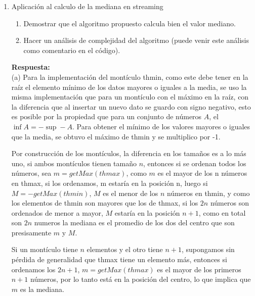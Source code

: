 \documentclass[11pt]{article}
\begin{document}
\begin{enumerate}
\begin{itemize}
\end{itemize}

\item Aplicación al calculo de la mediana en streaming
\begin{enumerate}
\item Demostrar que el algoritmo propuesto calcula bien el valor mediano.
\item Hacer un análisis de complejidad del algoritmo (puede venir este análisis como comentario en el
código).
\end{enumerate}
\textbf{Respuesta:}
\\
(a) Para la implementación del montículo thmin, como este debe tener en la raíz el elemento mínimo de los datos mayores o iguales a la media, se uso la misma implementación que para un montículo con el máximo en la raíz, con la diferencia que al insertar un nuevo dato se guardo con signo negativo, esto es posible por la propiedad que para un conjunto de números $A$, el $\inf A = -\sup -A$. Para obtener el mínimo de los valores mayores o iguales que la media, se obtuvo el máximo de thmin y se multiplico por -1.

Por construcción de los  montículos, la diferencia en los tamaños es a lo más uno, si ambos montículos tienen tamaño $n$, entonces si se ordenan todos los números, sea $m = getMax(thmax)$, como $m$ es el mayor de los n números en thmax, si los ordenamos, m estaría en la posición n, luego si $M=-getMax(thmin)$, $M$ es el menor de los $n$ números en thmin, y como los elementos de thmin son mayores que los de thmax, si los $2n$ números son ordenados de menor a mayor, $M$ estaría en la posición $n+1$, como en total son $2n$ numeros la mediana es el promedio de los dos del centro que son presisamente $m$ y $M$.

Si un montículo tiene $n$ elementos y el otro tiene $n+1$, supongamos sin pérdida de generalidad que thmax tiene un elemento más, entonces si ordenamos los $2n+1$, $m = getMax(thmax)$ es el mayor de los primeros $n+1$ números, por lo tanto está en la posición del centro, lo que implica que $m$ es la mediana.


\end{enumerate}
\end{document}
